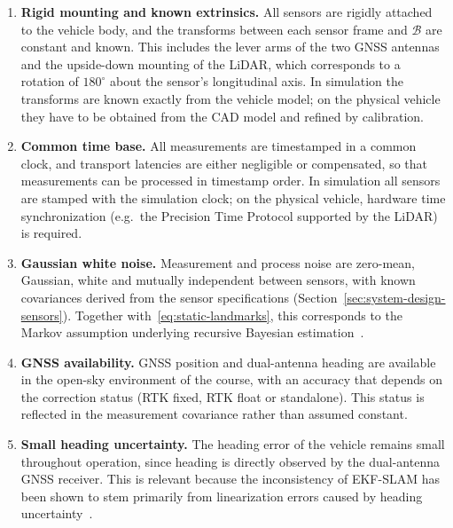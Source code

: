 \begin{enumerate}[label=\textbf{A\arabic*}, ref=A\arabic*, leftmargin=*]
  \item\label{asm:extrinsics}
  \textbf{Rigid mounting and known extrinsics.} All sensors are rigidly
  attached to the vehicle body, and the transforms between each sensor
  frame and $\mathcal{B}$ are constant and known. This includes the lever
  arms of the two GNSS antennas and the upside-down mounting of the LiDAR,
  which corresponds to a rotation of $180^\circ$ about the sensor's
  longitudinal axis. In simulation the transforms are known exactly from
  the vehicle model; on the physical vehicle they have to be obtained from
  the CAD model and refined by calibration.

  \item\label{asm:time}
  \textbf{Common time base.} All measurements are timestamped in a common
  clock, and transport latencies are either negligible or compensated, so
  that measurements can be processed in timestamp order. In simulation all
  sensors are stamped with the simulation clock; on the physical vehicle,
  hardware time synchronization (e.g.\ the Precision Time Protocol
  supported by the LiDAR) is required.

  \item\label{asm:noise}
  \textbf{Gaussian white noise.} Measurement and process noise are
  zero-mean, Gaussian, white and mutually independent between sensors, with
  known covariances derived from the sensor specifications
  (Section~\ref{sec:system-design-sensors}). Together
  with~\eqref{eq:static-landmarks}, this corresponds to the Markov
  assumption underlying recursive Bayesian estimation~\cite{thrun2005}.

  \item\label{asm:gnss}
  \textbf{GNSS availability.} GNSS position and dual-antenna heading are
  available in the open-sky environment of the course, with an accuracy
  that depends on the correction status (RTK fixed, RTK float or
  standalone). This status is reflected in the measurement covariance
  rather than assumed constant.

  \item\label{asm:heading}
  \textbf{Small heading uncertainty.} The heading error of the vehicle
  remains small throughout operation, since heading is directly observed by
  the dual-antenna GNSS receiver. This is relevant because the
  inconsistency of EKF-SLAM has been shown to stem primarily from
  linearization errors caused by heading uncertainty~\cite{bailey2006}.


\end{enumerate}
